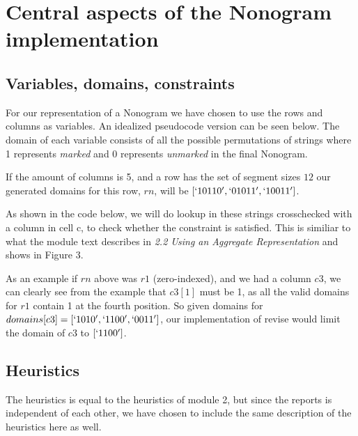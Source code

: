 
\section{Central aspects of the Nonogram implementation}
\subsection{Variables, domains, constraints}
For our representation of a Nonogram we have chosen to
use the rows and columns as variables. An idealized pseudocode
version can be seen below. The domain of each variable consists
of all the possible permutations of strings where 1 represents
\emph{marked} and 0 represents \emph{unmarked} in the final Nonogram.

If the amount of columns is 5, and a row has the set of segment
sizes \({1 2}\) our generated domains for this row, \(rn\), will be
\([`10110', `01011', `10011']\).

As shown in the code below, we will do lookup in these strings
crosschecked with a column in cell c, to check whether the constraint
is satisfied. This is similiar to what the module text describes in
\emph{2.2 Using an Aggregate Representation} and shows in Figure 3.

As an example if \(rn\) above was \(r1\) (zero-indexed), and we had a column
\(c3\), we can clearly see from the example that \(c3[1]\) must be 1, as all the
valid domains for \(r1\) contain 1 at the fourth position. So given domains
for \(domains[c3] = [`1010', `1100', `0011']\), our implementation of revise
would limit the domain of \(c3\) to \([`1100']\).



\subsection{Heuristics}
The heuristics is equal to the heuristics of module 2, but since the reports is independent of each other, we have chosen to include the same description of the heuristics here as well.

